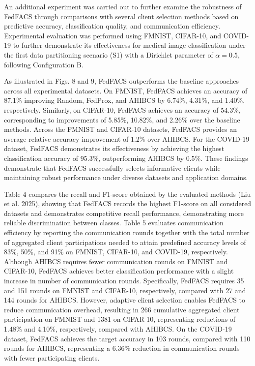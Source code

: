 \documentclass[pdflatex,sn-mathphys-num,oneside]{sn-jnl}%
\theoremstyle{thmstyleone}%
\theoremstyle{thmstyletwo}%
\theoremstyle{thmstylethree}%
\begin{document}
\par\vspace{1mm}

An additional experiment was carried out to further examine the robustness of FedFACS through comparisons with several client selection methods based on predictive accuracy, classification quality, and communication efficiency. Experimental evaluation was performed using FMNIST, CIFAR-10, and COVID-19 to further demonstrate its effectiveness for medical image classification under the first data partitioning scenario (S1) with a Dirichlet parameter of $\alpha = 0.5$, following Configuration B.

As illustrated in Figs. 8 and 9, FedFACS outperforms the baseline approaches across all experimental datasets. On FMNIST, FedFACS achieves an accuracy of 87.1\% improving Random, FedProx, and AHIBCS by 6.74\%, 4.31\%, and 1.40\%, respectively. Similarly, on CIFAR-10, FedFACS achieves an accuracy of 54.3\%, corresponding to improvements of 5.85\%, 10.82\%, and 2.26\% over the baseline methods. Across the FMNIST and CIFAR-10 datasets, FedFACS provides an average relative accuracy improvement of 1.2\% over AHIBCS. For the COVID-19 dataset, FedFACS demonstrates its effectiveness by achieving the highest classification accuracy of 95.3\%, outperforming AHIBCS by 0.5\%. These findings demonstrate that FedFACS successfully selects informative clients while maintaining robust performance under diverse datasets and application domains.   

Table 4 compares the recall and F1-score obtained by the evaluated methods (Liu et al. 2025), showing that FedFACS records the highest F1-score on all considered datasets and demonstrates competitive recall performance, demonstrating more reliable discrimination between classes. Table 5 evaluates communication efficiency by reporting the communication rounds together with the total number of aggregated client participations needed to attain predefined accuracy levels of 83\%, 50\%, and 91\% on FMNIST, CIFAR-10, and COVID-19, respectively. Although AHIBCS requires fewer communication rounds on FMNIST and CIFAR-10, FedFACS achieves better classification performance with a slight increase in number of communication rounds. Specifically, FedFACS requires 35 and 151 rounds on FMNIST and CIFAR-10, respectively, compared with 27 and 144 rounds for AHIBCS. However, adaptive client selection enables FedFACS to reduce communication overhead, resulting in 266 cumulative aggregated client participation on FMNIST and 1381 on CIFAR-10, representing reductions of 1.48\% and 4.10\%, respectively, compared with AHIBCS. On the COVID-19 dataset, FedFACS achieves the target accuracy in 103 rounds, compared with 110 rounds for AHIBCS, representing a 6.36\% reduction in communication rounds with fewer participating clients.
\end{document}
